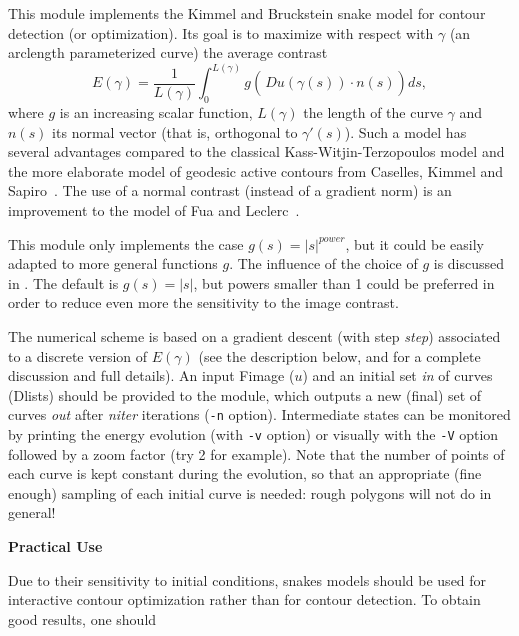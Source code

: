 This module implements the Kimmel and Bruckstein snake model
\cite{kimmel.bruckstein:on} for contour detection 
(or optimization). 
Its goal is to maximize with respect with 
$\gamma$ (an arclength parameterized curve) the average contrast
$$E(\gamma) =\frac 1 {L(\gamma)}\int_{0}^{L(\gamma)} g\left(\frac{}{}\!\!
Du(\gamma(s))\cdot n(s)\right)ds,$$
where $g$ is an increasing scalar function, $L(\gamma)$ the length of
the curve $\gamma$ and $n(s)$ its normal vector (that is, orthogonal
to $\gamma'(s)$). Such a model has several advantages compared to
the classical Kass-Witjin-Terzopoulos model \cite{kass.witkin.ea:snakes} and
the more elaborate model of geodesic active contours from 
Caselles, Kimmel and Sapiro~\cite{caselles.kimmel.ea:geodesic}. 
The use of a normal contrast (instead
of a gradient norm) is an improvement to the model of Fua
and Leclerc~\cite{fua.leclerc:model}.

This module only implements the case
$g(s)=|s|^{power}$, but it could be easily adapted to more general 
functions $g$. The influence of the
choice of $g$ is discussed in \cite{desolneux.moisan.ea:variational}.
The default is $g(s)=|s|$, but powers smaller than 1 could be preferred
in order to reduce even more the sensitivity to the image contrast.

The numerical scheme is based on a gradient descent (with step {\it step})
associated to a discrete version of $E(\gamma)$ (see the description 
below, and \cite{desolneux.moisan.ea:variational} for a complete discussion and full details).
An input Fimage ($u$) and an initial set {\it in}
of curves (Dlists) should be provided
to the module, which outputs a new (final) set of curves {\it out}
after {\it niter} iterations (\verb+-n+ option). Intermediate
states can be monitored by printing the energy evolution (with
\verb+-v+ option) or visually with the \verb+-V+ option followed by
a zoom factor (try 2 for example). Note that the number of points of
each curve is kept constant during the evolution, 
so that an appropriate (fine enough) sampling 
of each initial curve is needed: rough polygons will not do in general!

\vskip 8mm

\centerline {\bf \large Practical Use}

\vskip 6mm

Due to their sensitivity to initial conditions, snakes models should
be used for interactive contour optimization rather than for contour
detection. To obtain good results, one should

